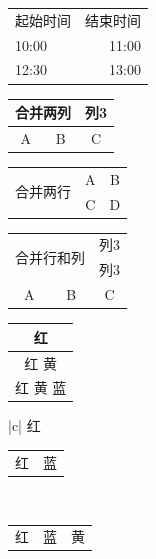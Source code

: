 \documentclass{article}
\begin{document}
\begin{tabular}{l @{--} r}
  起始时间 & 结束时间 \\
  10:00 & 11:00 \\
  12:30 & 13:00 \\
\end{tabular}

\vspace{1cm}   %

\begin{tabular}{|c|c|c|}
\hline
\multicolumn{2}{|c|}{合并两列}&列3 \\
\hline
A&B&C \\
\hline
\end{tabular}

\vspace{1cm}   %

\begin{tabular}{|c|c|c|}
\hline
\multirow{2}{*}{合并两行}&A&B \\ \cline{2-3}  %
& C & D \\
\hline
\end{tabular}

\vspace{1cm}   %

\begin{tabular}{|c|c|c|}
\hline
\multicolumn{2}{|c|}{\multirow{2}{*}{合并行和列}}&列3  \\ \cline{3-3}
\multicolumn{2}{|c|}{}&列3 \\
\hline
A&B&C \\
\hline
\end{tabular}

\vspace{1cm}   %

\begin{tabular}{|c|}
\hline
红 \\ \hline
红 \vline 黄 \\ \hline
红 \vline 黄 \vline 蓝 \\ \hline
\end{tabular} 

\vspace{1cm}   %

\begin{tabular}{|c|}
\hline
红 \\ 
\hline
\begin{tabular}{@{}c|c@{}}
红&蓝 
\end{tabular} \\
\hline
\begin{tabular}{@{}c|c|c@{}}
红&蓝&黄
\end{tabular} \\
\hline
\end{tabular}
\end{document}

